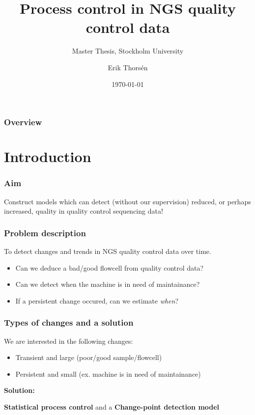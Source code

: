 \documentclass[10pt]{beamer}\usepackage[]{graphicx}\usepackage[]{color}
\begin{document}
\title{Process control in NGS quality control data}  
\subtitle{Master Thesis, Stockholm University}
\author{Erik Thors\'{e}n}
\date{\today} 

\begin{frame}
\titlepage
\end{frame}

\begin{frame}
  \frametitle{Overview}
  \tableofcontents
\end{frame}

\section{Introduction}
%
% 
\begin{frame}\frametitle{Aim}
\begin{center}
Construct models which can detect (without our supervision) reduced, or perhaps increased, quality in quality control sequencing data!
\end{center} 
\end{frame}
\begin{frame}\frametitle{Problem description}

\begin{center}
To detect changes and trends in NGS quality control data over time. 
\end{center}

\begin{itemize}
\item Can we deduce a bad/good flowcell from quality control data?
\item Can we detect when the machine is in need of maintainance?
\item If a persistent change occured, can we estimate \textit{when}?
\end{itemize}
\end{frame}


\begin{frame}\frametitle{Types of changes and a solution}
We are interested in the following changes:
\begin{itemize}
\item Transient and large (poor/good sample/flowcell)
\item Persistent and small (ex. machine is in need of maintainance)
\end{itemize}
\pause

\textbf{Solution:}
\begin{center}
\textbf{Statistical process control} and a \textbf{Change-point detection model} 
\end{center}
\end{frame}
\end{document}
